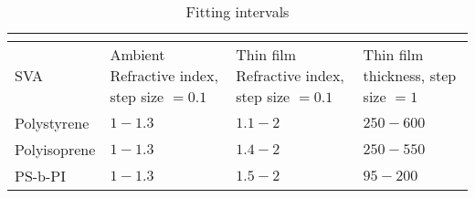 \documentclass[MasterThesisMain.tex]{subfiles}
\begin{document}
\begin{table}[H]
	\caption{Fitting intervals}
\begin{tabular}{ |p{4cm}||p{3cm}|p{3cm}|p{3cm}| }
 \hline
 \multicolumn{4}{|c|}{} \\
 \hline
 SVA & Ambient Refractive index, step size $=0.1$ & Thin film Refractive index, step size $=0.1$ & Thin film thickness, step size $=1$\\
 \hline
Polystyrene & $1-1.3$ & $1.1-2$ & $250-600$ \\
Polyisoprene & $1-1.3$ & $1.4-2$ & $250-550$ \\
PS-b-PI & $1-1.3$ & $1.5-2$ & $95-200$ \\ 
\hline 
\end{tabular}
\label{tab:modelinterval}
\end{table}
	
\end{document}
